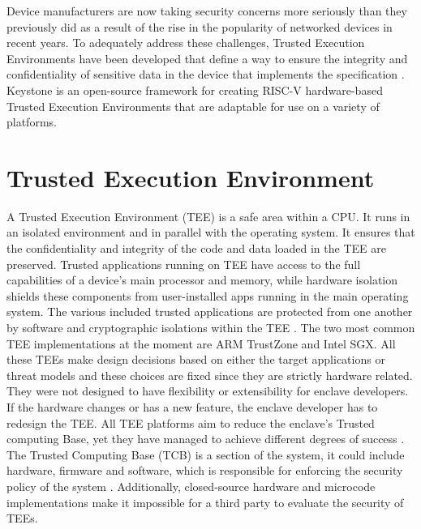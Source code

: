 
Device manufacturers are now taking security concerns more seriously than they previously did as a result of the rise in the popularity of networked devices in recent years.
To adequately address these challenges, Trusted Execution Environments have been developed that define a way to ensure the integrity and confidentiality of sensitive data in the device that implements the specification \cite{IntroTEE}. Keystone \cite{lee2020keystone} is an open-source framework for creating RISC-V hardware-based Trusted Execution Environments that are adaptable for use on a variety of platforms. 

\section{Trusted Execution Environment}
A Trusted Execution Environment (TEE) is a safe area within a CPU. It runs in an isolated environment and in parallel with the operating system.
It ensures that the confidentiality and integrity of the code and data loaded in the TEE are preserved. 
Trusted applications running on TEE have access to the full capabilities of a device's main processor and memory, while hardware isolation shields these components from user-installed apps running in the main operating system. The various included trusted applications are protected from one another by software and cryptographic isolations within the TEE \cite{IntroTEE}.
The two most common TEE implementations at the moment are ARM TrustZone and Intel SGX. All these TEEs make design decisions based on either the target applications or threat models and these choices are fixed since they are strictly hardware related. They were not designed to have flexibility or extensibility for enclave developers. If the hardware changes or has a new feature, the enclave developer has to redesign the TEE.
All TEE platforms aim to reduce the enclave's Trusted computing Base, yet they have managed to achieve different degrees of success \cite{keysyone-blog-1}. The Trusted Computing Base (TCB) is a section of the system, it could include hardware, firmware and software, which is responsible for enforcing the security policy of the system \cite{tcb-def}. Additionally, closed-source hardware and microcode implementations make it impossible for a third party to evaluate the security of TEEs.

